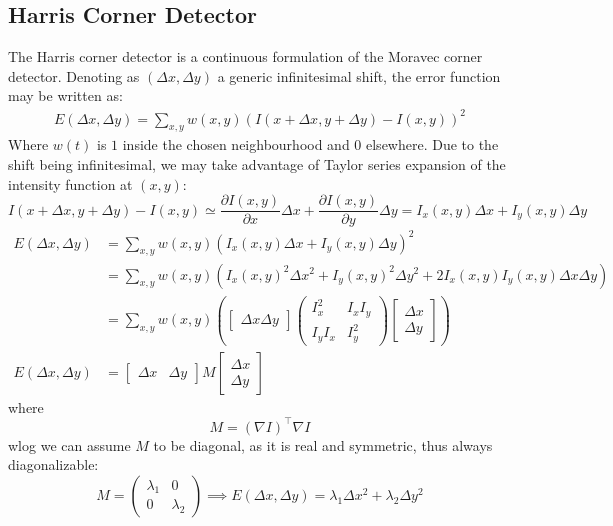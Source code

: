 \documentclass{article}
\begin{document}
\subsection{Harris Corner Detector}
The Harris corner detector is a continuous formulation of the Moravec corner detector. Denoting as $(\Delta x,\Delta y)$ a generic infinitesimal shift, the error function may be written as:
\begin{align*}
  E(\Delta x, \Delta y ) = \displaystyle\sum_{x,y}^{}w(x,y)(I(x+\Delta x, y + \Delta y)-I(x,y))^2
\end{align*}
Where $w(t)$ is $1$ inside the chosen neighbourhood and $0$ elsewhere.
Due to the shift being infinitesimal, we may take advantage of Taylor series expansion of the intensity function at $(x,y)$:
\[
  I(x+\Delta x, y+ \Delta y)-I(x,y) \simeq \displaystyle\frac{\partial I(x,y)}{\partial x}\Delta x + \displaystyle\frac{\partial I(x,y)}{\partial y}\Delta y = I_x(x,y)\Delta x + I_y (x,y) \Delta y
\]
\begin{align*}
    E(\Delta x, \Delta y ) &= \displaystyle\sum_{x,y}^{}w(x,y)(I_x(x,y)\Delta x + I_y(x,y)\Delta y )^2\\
    &=  \displaystyle\sum_{x,y}^{}w(x,y)(I_x(x,y)^2\Delta x^2 + I_y(x,y)^2\Delta y^2 + 2I_x(x,y)I_y(x,y)\Delta x \Delta y )\\
    &=\displaystyle\sum_{x,y}^{}w(x,y)\left( \begin{bmatrix}
      \Delta x \Delta y
      \end{bmatrix} \begin{pmatrix}
      I_x^2 & I_xI_y \\
      I_yI_x & I_y^2
      \end{pmatrix} \begin{bmatrix}
      \Delta x \\ \Delta y
  \end{bmatrix}\right) \\
    E(\Delta x, \Delta y) &= \begin{bmatrix}
    \Delta x & \Delta y
    \end{bmatrix} M \begin{bmatrix}
    \Delta x \\ \Delta y
  \end{bmatrix}
\end{align*}
where
\[
    M = (\nabla I)^\top\nabla I
\]
wlog we can assume $M$ to be diagonal, as it is real and symmetric, thus always diagonalizable:
\[
  M=\begin{pmatrix}
    \lambda_1 & 0 \\ 0 & \lambda_2
  \end{pmatrix} \implies E(\Delta x, \Delta y) = \lambda_1 \Delta x^2 + \lambda_2 \Delta y^2
\]
\end{document}
